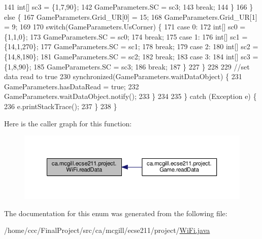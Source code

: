 \begin{DoxyCode}
141             \textcolor{keywordtype}{int}[] sc3 = \{1,7,90\};
142             GameParameters.SC = sc3;
143             \textcolor{keywordflow}{break};
144         \}
166       \} \textcolor{keywordflow}{else} \{
167         GameParameters.Grid\_UR[0] = 15;
168         GameParameters.Grid\_UR[1] = 9;
169  
170         \textcolor{keywordflow}{switch}(GameParameters.UsCorner) \{
171           \textcolor{keywordflow}{case} 0:
172             \textcolor{keywordtype}{int}[] sc0 = \{1,1,0\};
173             GameParameters.SC = sc0;
174             \textcolor{keywordflow}{break};
175           \textcolor{keywordflow}{case} 1:
176             \textcolor{keywordtype}{int}[] sc1 = \{14,1,270\};
177             GameParameters.SC = sc1;
178             \textcolor{keywordflow}{break};
179           \textcolor{keywordflow}{case} 2:
180             \textcolor{keywordtype}{int}[] sc2 = \{14,8,180\};
181             GameParameters.SC = sc2;
182             \textcolor{keywordflow}{break};
183           \textcolor{keywordflow}{case} 3:
184             \textcolor{keywordtype}{int}[] sc3 = \{1,8,90\};
185             GameParameters.SC = sc3;
186             \textcolor{keywordflow}{break};
187         \}
227       \}
228       
229       \textcolor{comment}{//set data read to true}
230       \textcolor{keyword}{synchronized}(GameParameters.waitDataObject) \{
231         GameParameters.hasDataRead = \textcolor{keyword}{true};
232         GameParameters.waitDataObject.notify();
233       \}
234       
235     \} \textcolor{keywordflow}{catch} (Exception e) \{
236       e.printStackTrace();
237     \}
238   \}
\end{DoxyCode}
Here is the caller graph for this function\+:
\nopagebreak
\begin{figure}[H]
\begin{center}
\leavevmode
\includegraphics[width=350pt]{enumca_1_1mcgill_1_1ecse211_1_1project_1_1_wi_fi_a3488726983cda70dbde6f05c9c762f16_icgraph}
\end{center}
\end{figure}


The documentation for this enum was generated from the following file\+:\begin{DoxyCompactItemize}
\item 
/home/ccc/\+Final\+Project/src/ca/mcgill/ecse211/project/\hyperlink{_wi_fi_8java}{Wi\+Fi.\+java}\end{DoxyCompactItemize}
